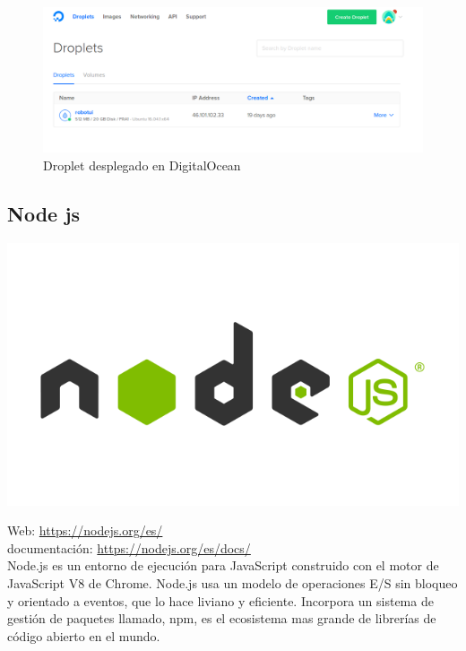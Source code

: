 \begin{figure}[H]
\begin{center}
\includegraphics[scale=0.45]{imagenes/droplets.png}
\caption{Droplet desplegado en DigitalOcean}
\end{center}
\end{figure}


\subsection{Node js}

\begin{center}
\includegraphics[scale=0.3]{imagenes/nodejs-logo.png}
\end{center}

Web: \url{https://nodejs.org/es/}\\
documentación: \url{https://nodejs.org/es/docs/}\cite{website:8}\\

Node.js es un entorno de ejecución para JavaScript construido con el motor de JavaScript V8 de Chrome. Node.js usa un modelo de operaciones E/S sin bloqueo y orientado a eventos, que lo hace liviano y eficiente. Incorpora un sistema de gestión de paquetes llamado, npm, es el ecosistema mas grande de librerías de código abierto en el mundo.\\

